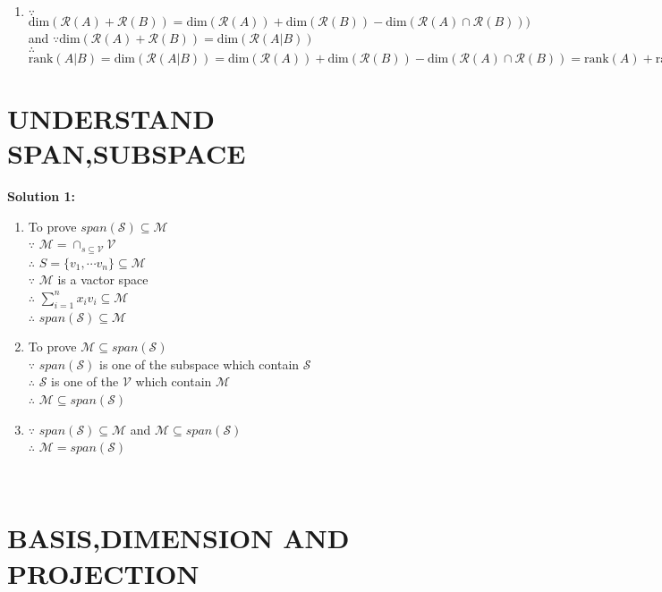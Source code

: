 \documentclass[english,onecolumn,UTF8]{IEEEtran}
\begin{document}
\begin{enumerate}
	\item 
		$\because$ $\mbox{dim}(\mathcal{R}(A)+\mathcal{R}(B))=\mbox{dim}(\mathcal{R}(A))+\mbox{dim}(\mathcal{R}(B))-\mbox{dim}(\mathcal{R}(A)\cap\mathcal{R}(B)))$ and $\because$$\mbox{dim}(\mathcal{R}(A)+\mathcal{R}(B))=\mbox{dim}(\mathcal{R}(A|B))$\\
		$\therefore$ $\mbox{rank}(A|B)=\mbox{dim}(\mathcal{R}(A|B))=\mbox{dim}(\mathcal{R}(A))+\mbox{dim}(\mathcal{R}(B))-\mbox{dim}(\mathcal{R}(A)\cap\mathcal{R}(B))=\mbox{rank}(A)+\mbox{rank}(B)-\mbox{dim}(\mathcal{R}(A)\cap\mathcal{R}(B))$
	\end{enumerate}
	
\section{UNDERSTAND SPAN,SUBSPACE}
	\textbf{Solution 1:}
	\begin{enumerate}
	\item 
		To prove $span(\mathcal{S})\subseteq \mathcal{M}$\\
		$\because$ $\mathcal{M}=\cap_{s\subseteq\mathcal{V}}\mathcal{V}$\\
		$\therefore$ $S=\{v_1,\cdots v_n\} \subseteq \mathcal{M}$\\
		$\because$ $\mathcal{M}$ is a vactor space\\
		$\therefore$ $\sum^n_{i=1}x_iv_i\subseteq \mathcal{M}$\\
		$\therefore$ $span(\mathcal{S})\subseteq \mathcal{M}$
	\item
		To prove $\mathcal{M}\subseteq span(\mathcal{S})$\\
		$\because$ $span(\mathcal{S})$ is one of the subspace which contain $\mathcal{S}$\\
		$\therefore$ $\mathcal{S}$ is one of the $\mathcal{V}$ which contain $\mathcal{M}$\\
		$\therefore$ $\mathcal{M}\subseteq span(\mathcal{S})$

	\item 
		$\because$ $span(\mathcal{S})\subseteq \mathcal{M}$ and $\mathcal{M}\subseteq span(\mathcal{S})$\\
		$\therefore$ $\mathcal{M}=span(\mathcal{S})$
	\end{enumerate}

~\\

\section{BASIS,DIMENSION AND PROJECTION}
\end{document}
